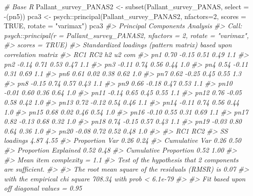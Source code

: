 \documentclass[
]{article}
\newenvironment{Shaded}{\begin{snugshade}}{\end{snugshade}}
\newcommand{\AttributeTok}[1]{\textcolor[rgb]{0.77,0.63,0.00}{#1}}
\newcommand{\CommentTok}[1]{\textcolor[rgb]{0.56,0.35,0.01}{\textit{#1}}}
\newcommand{\ConstantTok}[1]{\textcolor[rgb]{0.00,0.00,0.00}{#1}}
\newcommand{\DecValTok}[1]{\textcolor[rgb]{0.00,0.00,0.81}{#1}}
\newcommand{\FunctionTok}[1]{\textcolor[rgb]{0.00,0.00,0.00}{#1}}
\newcommand{\NormalTok}[1]{#1}
\newcommand{\OtherTok}[1]{\textcolor[rgb]{0.56,0.35,0.01}{#1}}
\newcommand{\SpecialCharTok}[1]{\textcolor[rgb]{0.00,0.00,0.00}{#1}}
\newcommand{\StringTok}[1]{\textcolor[rgb]{0.31,0.60,0.02}{#1}}
\begin{document}
\begin{Shaded}
\begin{Highlighting}[]
\CommentTok{\# Base R}
\NormalTok{Pallant\_survey\_PANAS2 }\OtherTok{\textless{}{-}} \FunctionTok{subset}\NormalTok{(Pallant\_survey\_PANAS, }\AttributeTok{select =} \SpecialCharTok{{-}}\NormalTok{(pn5))}
\NormalTok{pca3 }\OtherTok{\textless{}{-}}\NormalTok{ psych}\SpecialCharTok{::}\FunctionTok{principal}\NormalTok{(Pallant\_survey\_PANAS2, }\AttributeTok{nfactors=}\DecValTok{2}\NormalTok{, }\AttributeTok{scores =} \ConstantTok{TRUE}\NormalTok{, }\AttributeTok{rotate =} \StringTok{"varimax"}\NormalTok{)}
\NormalTok{pca3}
\CommentTok{\#\textgreater{} Principal Components Analysis}
\CommentTok{\#\textgreater{} Call: psych::principal(r = Pallant\_survey\_PANAS2, nfactors = 2, rotate = "varimax", }
\CommentTok{\#\textgreater{}     scores = TRUE)}
\CommentTok{\#\textgreater{} Standardized loadings (pattern matrix) based upon correlation matrix}
\CommentTok{\#\textgreater{}        RC1   RC2   h2   u2 com}
\CommentTok{\#\textgreater{} pn1   0.70 {-}0.15 0.51 0.49 1.1}
\CommentTok{\#\textgreater{} pn2  {-}0.14  0.71 0.53 0.47 1.1}
\CommentTok{\#\textgreater{} pn3  {-}0.11  0.74 0.56 0.44 1.0}
\CommentTok{\#\textgreater{} pn4   0.54 {-}0.11 0.31 0.69 1.1}
\CommentTok{\#\textgreater{} pn6   0.61  0.02 0.38 0.62 1.0}
\CommentTok{\#\textgreater{} pn7   0.62 {-}0.25 0.45 0.55 1.3}
\CommentTok{\#\textgreater{} pn8  {-}0.15  0.74 0.57 0.43 1.1}
\CommentTok{\#\textgreater{} pn9   0.66 {-}0.18 0.47 0.53 1.1}
\CommentTok{\#\textgreater{} pn10 {-}0.01  0.60 0.36 0.64 1.0}
\CommentTok{\#\textgreater{} pn11 {-}0.14  0.65 0.45 0.55 1.1}
\CommentTok{\#\textgreater{} pn12  0.76 {-}0.05 0.58 0.42 1.0}
\CommentTok{\#\textgreater{} pn13  0.72 {-}0.12 0.54 0.46 1.1}
\CommentTok{\#\textgreater{} pn14 {-}0.11  0.74 0.56 0.44 1.0}
\CommentTok{\#\textgreater{} pn15  0.68  0.02 0.46 0.54 1.0}
\CommentTok{\#\textgreater{} pn16 {-}0.10  0.55 0.31 0.69 1.1}
\CommentTok{\#\textgreater{} pn17  0.82 {-}0.13 0.68 0.32 1.0}
\CommentTok{\#\textgreater{} pn18  0.74 {-}0.15 0.57 0.43 1.1}
\CommentTok{\#\textgreater{} pn19 {-}0.03  0.80 0.64 0.36 1.0}
\CommentTok{\#\textgreater{} pn20 {-}0.08  0.72 0.52 0.48 1.0}
\CommentTok{\#\textgreater{} }
\CommentTok{\#\textgreater{}                        RC1  RC2}
\CommentTok{\#\textgreater{} SS loadings           4.87 4.55}
\CommentTok{\#\textgreater{} Proportion Var        0.26 0.24}
\CommentTok{\#\textgreater{} Cumulative Var        0.26 0.50}
\CommentTok{\#\textgreater{} Proportion Explained  0.52 0.48}
\CommentTok{\#\textgreater{} Cumulative Proportion 0.52 1.00}
\CommentTok{\#\textgreater{} }
\CommentTok{\#\textgreater{} Mean item complexity =  1.1}
\CommentTok{\#\textgreater{} Test of the hypothesis that 2 components are sufficient.}
\CommentTok{\#\textgreater{} }
\CommentTok{\#\textgreater{} The root mean square of the residuals (RMSR) is  0.07 }
\CommentTok{\#\textgreater{}  with the empirical chi square  708.34  with prob \textless{}  6.1e{-}79 }
\CommentTok{\#\textgreater{} }
\CommentTok{\#\textgreater{} Fit based upon off diagonal values = 0.95}
\end{Highlighting}
\end{Shaded}
\end{document}
